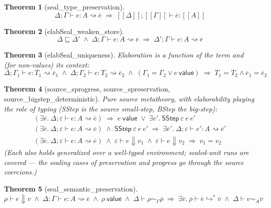 \documentclass[10pt]{article}
\newtheorem{theorem}{Theorem}[section]
\newcommand{\tp}{\varepsilon}
\newcommand{\Val}{\mathsf{value}}
\newcommand{\msteps}[3]{#1 \vdash #2 \hookrightarrow^{*} #3}
\newcommand{\hast}[4]{#1; #2 \vdash #3 : #4}
\newcommand{\storele}{\sqsubseteq}
\newcommand{\bstep}[3]{#1 \vdash #2 \Downarrow #3}
\newcommand{\sT}[1]{[\![#1]\!]}
\newcommand{\elab}[5]{#1; #2 \vdash #3 : #4 \rightsquigarrow #5}
\newcommand{\eva}[4]{#1 \vdash #2 \sim_{#3} #4}
\begin{document}
\begin{theorem}[\textsf{seal\_type\_preservation}]
\[
\elab{\Delta}{\Gamma}{e}{A}{\overline{e}} \;\Longrightarrow\; \hast{\sT{\Delta}}{\sT{\Gamma}}{\overline{e}}{\sT{A}}
\]
\end{theorem}

\begin{theorem}[\textsf{elabSeal\_weaken\_store}]
\[
\Delta \storele \Delta' \;\wedge\; \elab{\Delta}{\Gamma}{e}{A}{\overline{e}} \;\Longrightarrow\; \elab{\Delta'}{\Gamma}{e}{A}{\overline{e}}
\]
\end{theorem}

\begin{theorem}[\textsf{elabSeal\_uniqueness}]
Elaboration is a function of the term and (for non-values) its context:
\[
\elab{\Delta}{\Gamma_1}{e}{T_1}{\overline{e}_1} \;\wedge\; \elab{\Delta}{\Gamma_2}{e}{T_2}{\overline{e}_2}
\;\wedge\; (\Gamma_1 = \Gamma_2 \vee e\ \Val) \;\Longrightarrow\; T_1 = T_2 \wedge \overline{e}_1 = \overline{e}_2
\]
\end{theorem}

\begin{theorem}[\textsf{source\_sprogress}, \textsf{source\_spreservation}, \textsf{source\_bigstep\_deterministic}]
Pure source metatheory, with elaborability playing the role of typing (SStep is the
source small-step, BStep the big-step):
\[
\begin{array}{l}
(\exists \overline{e}.\ \elab{\Delta}{\tp}{e}{A}{\overline{e}}) \;\Longrightarrow\; e\ \Val \;\vee\; \exists e'.\ \mathsf{SStep}\ \tp\ e\ e' \\[2pt]
(\exists \overline{e}.\ \elab{\Delta}{\tp}{e}{A}{\overline{e}}) \;\wedge\; \mathsf{SStep}\ \tp\ e\ e' \;\Longrightarrow\; \exists \overline{e}'.\ \elab{\Delta}{\tp}{e'}{A}{\overline{e}'} \\[2pt]
(\exists \overline{e}.\ \elab{\Delta}{\tp}{e}{A}{\overline{e}}) \;\wedge\; \bstep{\tp}{e}{v_1} \;\wedge\; \bstep{\tp}{e}{v_2} \;\Longrightarrow\; v_1 = v_2
\end{array}
\]
(Each also holds generalized over a well-typed environment; sealed-unit runs are
covered — the sealing cases of preservation and progress go through the source
coercions.)
\end{theorem}

\begin{theorem}[\textsf{seal\_semantic\_preservation}]
\[
\bstep{\rho}{e}{v} \;\wedge\; \elab{\Delta}{\Gamma}{e}{A}{\overline{e}} \;\wedge\; \rho\ \Val \;\wedge\; \eva{\Delta}{\rho}{\Gamma}{\overline{\rho}}
\;\Longrightarrow\;
\exists \overline{v}.\ \msteps{\overline{\rho}}{\overline{e}}{\overline{v}} \;\wedge\; \eva{\Delta}{v}{A}{\overline{v}}
\]
\end{theorem}
\end{document}
